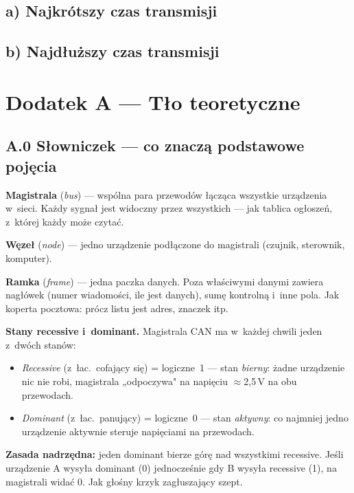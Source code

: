 \documentclass[12pt,a4paper]{article}
\begin{document}
\subsection*{a) Najkrótszy czas transmisji}


\subsection*{b) Najdłuższy czas transmisji}



\appendix

\section*{Dodatek A — Tło teoretyczne}

\subsection*{A.0 Słowniczek — co znaczą podstawowe pojęcia}

\textbf{Magistrala} (\textit{bus}) — wspólna para przewodów łącząca wszystkie
urządzenia w~sieci. Każdy sygnał jest widoczny przez wszystkich — jak tablica
ogłoszeń, z~której każdy może czytać.

\medskip
\textbf{Węzeł} (\textit{node}) — jedno urządzenie podłączone do magistrali
(czujnik, sterownik, komputer).

\medskip
\textbf{Ramka} (\textit{frame}) — jedna paczka danych. Poza właściwymi danymi
zawiera nagłówek (numer wiadomości, ile jest danych), sumę kontrolną i~inne pola.
Jak koperta pocztowa: prócz listu jest adres, znaczek itp.

\medskip
\textbf{Stany recessive i~dominant.}
Magistrala CAN ma w~każdej chwili jeden z~dwóch stanów:
\begin{itemize}
    \item \textit{Recessive} (z~łac.\ cofający się) = logiczne~1 — stan
          \emph{bierny}: żadne urządzenie nic nie robi, magistrala
          „odpoczywa" na napięciu $\approx$2,5\,V na obu przewodach.
    \item \textit{Dominant} (z~łac.\ panujący) = logiczne~0 — stan
          \emph{aktywny}: co najmniej jedno urządzenie aktywnie steruje
          napięciami na przewodach.
\end{itemize}
\textbf{Zasada nadrzędna:} jeden dominant bierze górę nad wszystkimi
recessive. Jeśli urządzenie A wysyła dominant (0) jednocześnie gdy B wysyła
recessive (1), na magistrali widać 0. Jak głośny krzyk zagłuszający szept.
\end{document}
